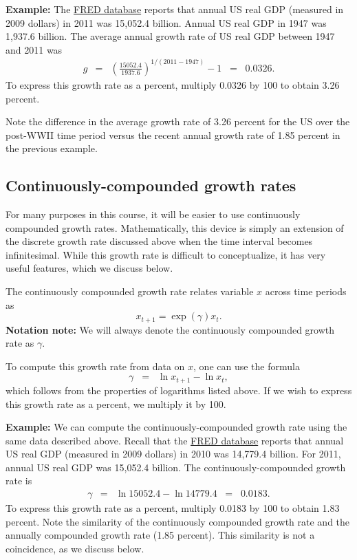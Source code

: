 \textbf{Example:}  The \href{http://research.stlouisfed.org/fred2/series/GDPC1/downloaddata?cid=106}{FRED database} reports that annual US real GDP (measured in 2009 dollars) in 2011 was 15,052.4 billion. Annual US real GDP in 1947 was 1,937.6 billion.  The average annual growth rate of US real GDP between 1947 and 2011 was
\begin{eqnarray*}
    g &=& \left(\frac{15052.4}{1937.6}\right)^{{1}/{(2011-1947)}} - 1  \;\;=\;\; 0.0326.
\end{eqnarray*}
To express this growth rate as a percent, multiply 0.0326 by 100 to obtain 3.26 percent.

Note the difference in the average growth rate of 3.26 percent for the US over the post-WWII time period  versus the recent annual growth rate of 1.85 percent in the previous example.


\subsection*{Continuously-compounded growth rates  }
\label{sec:growth_math_cc}

For many purposes in this course, it will be easier to use continuously compounded growth rates. Mathematically, this device is simply an extension of the discrete growth rate discussed above when the time interval becomes infinitesimal. While this growth rate is difficult to conceptualize, it has very useful features, which we discuss below.

The continuously compounded growth rate relates variable $x$ across time periods as
\[
    x_{t+1} = \exp(\gamma)x_{t}.
\]
\textbf{Notation note:} We will always denote the continuously compounded growth rate as $ \gamma $.

To compute this growth rate from data on $x$, one can use the formula
\[
    \gamma \;\;=\;\; \ln x_{t+1} - \ln x_{t},
\]
which follows from the properties of logarithms listed above. If we wish to express this growth rate as a percent, we multiply it by 100.

\textbf{Example:}  We can compute the continuously-compounded   growth rate using the same data described above. Recall that the \href{http://research.stlouisfed.org/fred2/series/GDPC1/downloaddata?cid=106}{FRED database} reports that annual US real GDP (measured in 2009 dollars) in 2010 was 14,779.4 billion.
For 2011, annual US real GDP was 15,052.4 billion. The continuously-compounded   growth rate is
\begin{eqnarray*}
    \gamma &=& \ln 15052.4 - \ln 14779.4  \;\;=\;\; 0.0183.
\end{eqnarray*}
To express this growth rate as a percent, multiply 0.0183 by 100 to obtain 1.83 percent. Note the similarity of the continuously compounded growth rate and the annually compounded growth rate (1.85 percent). This similarity is not a coincidence, as we discuss below.

